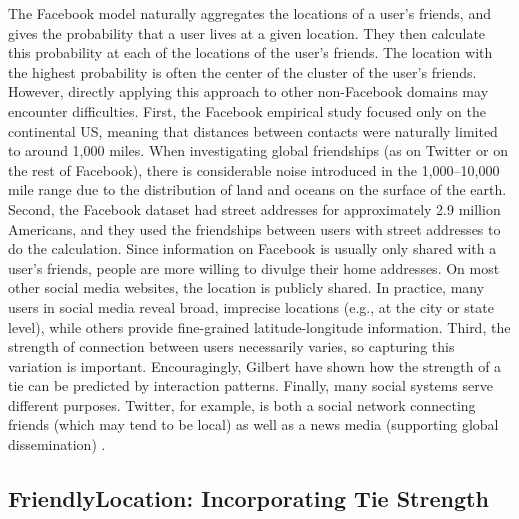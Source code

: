 \documentclass{sig-alternate}
\begin{document}
The Facebook model naturally aggregates the locations of a user's friends, and
gives the probability that a user lives at a given location.
%
They then calculate this probability at each of the locations of the user's friends.
%
The location with the highest probability is often the center of the cluster of
the user's friends.
%
However, directly applying this approach to other non-Facebook domains may
encounter difficulties.
%
First, the Facebook empirical study focused only on the continental US, meaning
that distances between contacts were naturally limited to around 1,000 miles.
%
When investigating global friendships (as on Twitter or on the rest of
Facebook), there is considerable noise introduced in the 1,000--10,000 mile
range due to the distribution of land and oceans on the surface of the earth.
%
Second, the Facebook dataset had street addresses for approximately 2.9 million
Americans, and they used the friendships between users with street addresses to
do the calculation.
%
Since information on Facebook is usually only shared with a user's friends,
people are more willing to divulge their home addresses.
%
On most other social media websites, the location is publicly shared.
%
In practice, many users in social media reveal broad, imprecise
locations (e.g., at the city or state level), while others provide fine-grained
latitude-longitude information.
%
Third, the strength of connection between users necessarily varies, so
capturing this variation is important.
%
Encouragingly, Gilbert \cite{gilbert2009predicting} have shown how the strength
of a tie can be predicted by interaction patterns.
%
Finally, many social systems serve different purposes.
%
Twitter, for example, is both a social network connecting friends (which may
tend to be local) as well as a news media (supporting global dissemination)
\cite{kwak2010why}.

\subsection{FriendlyLocation: Incorporating Tie Strength}
\end{document}
